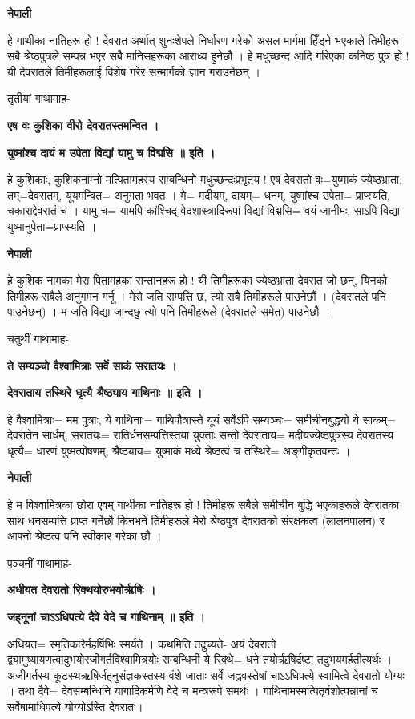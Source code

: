 \documentclass[11pt, a5paper]{article}
\begin{document}
\textbf{नेपाली}

हे गाथीका नातिहरू हो ! देवरात अर्थात् शुनःशेपले निर्धारण गरेको असल मार्गमा हिँड्ने भएकाले तिमीहरू सबै श्रेष्ठपुत्रले सम्पन्न भएर सबै मानिसहरूका आराध्य हुनेछौ । हे मधुच्छन्द आदि गरिएका कनिष्ठ पुत्र हो ! यी देवरातले तिमीहरूलाई विशेष गरेर सन्मार्गको ज्ञान गराउनेछन् ।

तृतीयां गाथामाह-

\textbf{एष वः कुशिका वीरो देवरातस्तमन्वित ।}

\textbf{युष्मांश्च दायं म उपेता विद्यां यामु च विद्मसि ॥ इति ।}

हे कुशिकाः, कुशिकनाम्नो मत्पितामहस्य सम्बन्धिनो मधुच्छन्दःप्रभृतय !  एष देवरातो वः=युष्माकं ज्येष्ठभ्राता, तम्=देवरातम्, यूयमन्वित= अनुगता भवत । मे= मदीयम्, दायम्= धनम्, युष्मांश्च उपेता= प्राप्स्यति, चकाराद्देवरातं च । यामु च= यामपि कांश्चिद् वेदशास्त्रादिरूपां विद्यां विद्मसि= वयं जानीमः, साऽपि विद्या युष्मानुपेता=प्राप्स्यति ।

\textbf{नेपाली}

हे कुशिक नामका मेरा पितामहका सन्तानहरू हो ! यी तिमीहरूका ज्येष्ठभ्राता देवरात जो छन्, यिनको तिमीहरू सबैले अनुगमन गर्नू । मेरो जति सम्पत्ति छ, त्यो सबै तिमीहरूले पाउनेछौं । (देवरातले पनि पाउनेछन्) । म जति विद्या जान्दछु त्यो पनि तिमीहरूले (देवरातले समेत) पाउनेछौ ।

चतुर्थीं गाथामाह-

\textbf{ते सम्यञ्चो वैश्वामित्राः सर्वे साकं सरातयः ।}

\textbf{देवराताय तस्थिरे धृत्यै श्रैष्ठ्याय गाथिनाः ॥ इति ।}

हे वैश्वामित्राः= मम पुत्राः, ये गाथिनाः= गाथिपौत्रास्ते यूयं सर्वेऽपि सम्यञ्चः= समीचीनबुद्धयो ये साकम्= देवरातेन सार्धम्, सरातयः= रातिर्धनसम्पत्तिस्तया युक्ताः सन्तो देवराताय= मदीयज्येष्ठपुत्रस्य देवरातस्य धृत्यै= धारणं युष्मत्पोषणम्, श्रैष्ठ्याय= युष्माकं मध्ये श्रेष्ठत्वं च तस्थिरे= अङ्गीकृतवन्तः ।

\textbf{नेपाली}

हे म विश्वामित्रका छोरा एवम् गाथीका नातिहरू हो ! तिमीहरू सबैले समीचीन बुद्धि भएकाहरूले देवरातका साथ धनसम्पत्ति प्राप्त गर्नेछौ किनभने तिमीहरूले मेरो श्रेष्ठपुत्र देवरातको संरक्षकत्व (लालनपालन) र आफ्नो श्रेष्ठत्व पनि  स्वीकार गरेका छौ ।

पञ्चमीं गाथामाह-

\textbf{अधीयत देवरातो रिक्थयोरुभयोर्ऋषिः ।}

\textbf{जह्‌नूनां चाऽऽधिपत्ये दैवे वेदे च गाथिनाम् ॥ इति ।}

अधियत= स्मृतिकारैर्महर्षिभिः स्मर्यते । कथमिति तदुच्यते- अयं देवरातो द्व्यामुष्यायणत्वादुभयोरजीगर्तविश्वामित्रयोः सम्बन्धिनी ये रिक्थे= धने तयोर्ऋषिर्द्रष्टा तदुभयमर्हतीत्यर्थः । अजीगर्तस्य कूटस्थऋषिर्जह्‌नुसंज्ञकस्तस्य वंशे जाताः सर्वे जह्नवस्तेषां चाऽऽधिपत्ये स्वामित्वे देवरातो योग्यः । तथा दैवे= देवसम्बन्धिनि यागादिकर्मणि वेदे च मन्त्ररूपे समर्थः । गाथिनामस्मत्पितृवंशोत्पन्नानां च सर्वेषामाधिपत्ये योग्योऽस्ति देवरातः।
\end{document}

